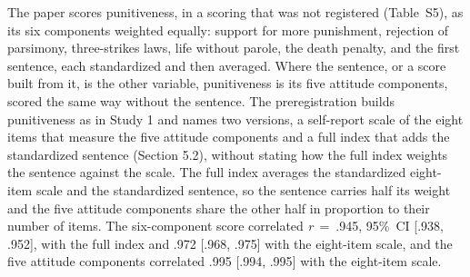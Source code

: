 The paper scores punitiveness, in a scoring that was not registered (Table~S5), as its six components weighted equally: support for more punishment, rejection of parsimony, three-strikes laws, life without parole, the death penalty, and the first sentence, each standardized and then averaged. Where the sentence, or a score built from it, is the other variable, punitiveness is its five attitude components, scored the same way without the sentence. The preregistration builds punitiveness as in Study 1 and names two versions, a self-report scale of the eight items that measure the five attitude components and a full index that adds the standardized sentence (Section 5.2), without stating how the full index weights the sentence against the scale. The full index averages the standardized eight-item scale and the standardized sentence, so the sentence carries half its weight and the five attitude components share the other half in proportion to their number of items. The six-component score correlated \emph{r}~=~.945, 95\%~CI {[}.938, .952{]}, with the full index and .972 {[}.968, .975{]} with the eight-item scale, and the five attitude components correlated .995 {[}.994, .995{]} with the eight-item scale.

